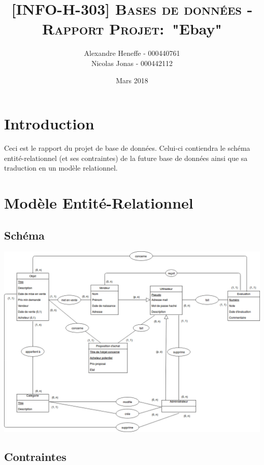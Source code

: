 \documentclass{article}
\title{\textsc{[INFO-H-303] Bases de données - Rapport Projet:}\
   "Ebay"}
\author{Alexandre Heneffe - 000440761\\
        Nicolas Jonas - 000442112}
\date{Mars 2018}
\begin{document}
\maketitle
\section{Introduction}

Ceci est le rapport du projet de base de données. Celui-ci contiendra le schéma entité-relationnel (et ses contraintes) de la future base de données ainsi que sa traduction en un modèle relationnel.

\section{Modèle Entité-Relationnel}

\subsection{Schéma}

\begin{center}
    \includegraphics[scale=0.45,left]{schemaEA}
\end{center}

\newpage

\subsection{Contraintes}
\end{document}

